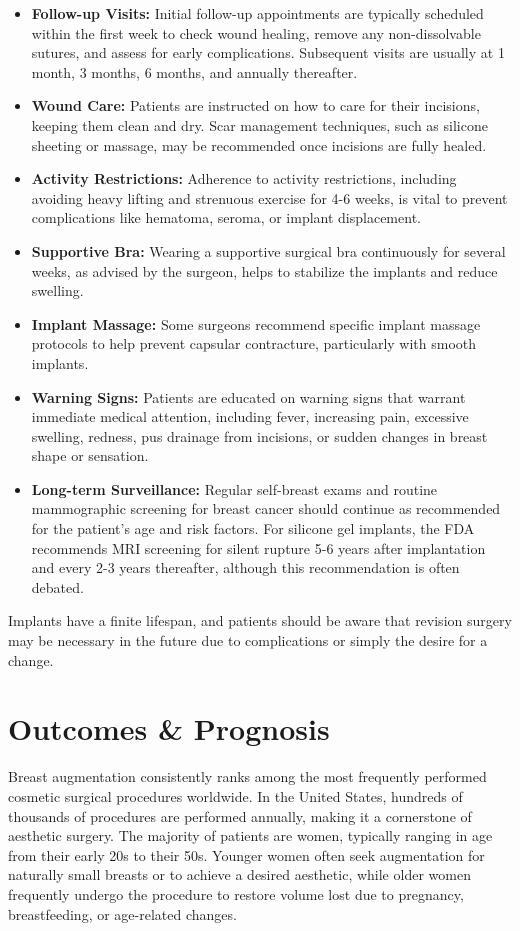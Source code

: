 \begin{itemize}
  \item \textbf{Follow-up Visits:} Initial follow-up appointments are typically scheduled within the first week to check wound healing, remove any non-dissolvable sutures, and assess for early complications. Subsequent visits are usually at 1 month, 3 months, 6 months, and annually thereafter.
  \item \textbf{Wound Care:} Patients are instructed on how to care for their incisions, keeping them clean and dry. Scar management techniques, such as silicone sheeting or massage, may be recommended once incisions are fully healed.
  \item \textbf{Activity Restrictions:} Adherence to activity restrictions, including avoiding heavy lifting and strenuous exercise for 4-6 weeks, is vital to prevent complications like hematoma, seroma, or implant displacement.
  \item \textbf{Supportive Bra:} Wearing a supportive surgical bra continuously for several weeks, as advised by the surgeon, helps to stabilize the implants and reduce swelling.
  \item \textbf{Implant Massage:} Some surgeons recommend specific implant massage protocols to help prevent capsular contracture, particularly with smooth implants.
  \item \textbf{Warning Signs:} Patients are educated on warning signs that warrant immediate medical attention, including fever, increasing pain, excessive swelling, redness, pus drainage from incisions, or sudden changes in breast shape or sensation.
  \item \textbf{Long-term Surveillance:} Regular self-breast exams and routine mammographic screening for breast cancer should continue as recommended for the patient's age and risk factors. For silicone gel implants, the FDA recommends MRI screening for silent rupture 5-6 years after implantation and every 2-3 years thereafter, although this recommendation is often debated.
\end{itemize}
Implants have a finite lifespan, and patients should be aware that revision surgery may be necessary in the future due to complications or simply the desire for a change.

\section*{Outcomes \& Prognosis}
Breast augmentation consistently ranks among the most frequently performed cosmetic surgical procedures worldwide. In the United States, hundreds of thousands of procedures are performed annually, making it a cornerstone of aesthetic surgery. The majority of patients are women, typically ranging in age from their early 20s to their 50s. Younger women often seek augmentation for naturally small breasts or to achieve a desired aesthetic, while older women frequently undergo the procedure to restore volume lost due to pregnancy, breastfeeding, or age-related changes.

